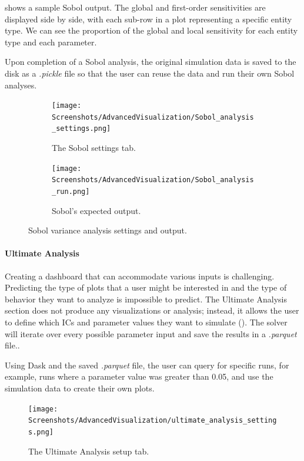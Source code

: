  shows a sample Sobol output. 
The global and first-order sensitivities are displayed side by side, with each sub-row in a plot representing a specific entity type. 
We can see the proportion of the global and local sensitivity for each entity type and each parameter.

Upon completion of a Sobol analysis, the original simulation data is saved to the disk as a \textit{.pickle} file so that the user can reuse the data and run their own Sobol analyses. 

\begin{figure}[h!]
    \centering
    \begin{subfigure}{0.49\linewidth}
        \centering
        \captionsetup{width=1\linewidth}
        \texttt{[image: Screenshots/AdvancedVisualization/Sobol\_analysis\_settings.png]}
        \caption{
            The Sobol settings tab. 
        }
        \label{fig:ss:av:Sobol_analysis_settings}
    \end{subfigure}
    \hfill
    \begin{subfigure}{0.49\linewidth}
        \centering
        \captionsetup{width=1\linewidth}
        \texttt{[image: Screenshots/AdvancedVisualization/Sobol\_analysis\_run.png]}
        \caption{
            Sobol's expected output. 
        }
        \label{fig:ss:av:Sobol_analysis_run}
    \end{subfigure}
    \caption{Sobol variance analysis settings and output. }
\end{figure}

\paragraph{Ultimate Analysis}
\label{sec:ultimate_analysis}
Creating a dashboard that can accommodate various inputs is challenging. 
Predicting the type of plots that a user might be interested in and the type of behavior they want to analyze is impossible to predict. 
The Ultimate Analysis section does not produce any visualizations or analysis; instead, it allows the user to define which ICs and parameter values they want to simulate ().
The solver will iterate over every possible parameter input and save the results in a \textit{.parquet} file..

Using Dask and the saved \textit{.parquet} file, the user can query for specific runs, for example, runs where a parameter value was greater than 0.05, and use the simulation data to create their own plots.
\begin{figure}
    \centering
    \texttt{[image: Screenshots/AdvancedVisualization/ultimate\_analysis\_settings.png]}
    \caption{
        The Ultimate Analysis setup tab. 
    }
    \label{fig:ss:av:ultimate_analysis_settings}
\end{figure}


